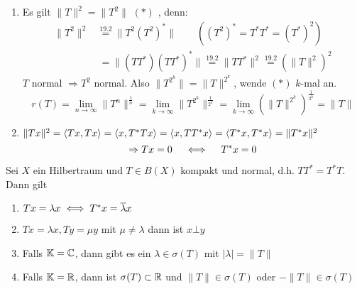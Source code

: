 \begin{beweis}
	\begin{enumerate}[label=\alph*\upshape)]
		\item Es gilt $\| T \|^{2} = \| T^{2} \|$ $(*)$ \label{prop:19.9.5-*}, denn:
			\begin{align*}
				\| T^{2} \|^{2} & \overset{\hyperref[bem:19.2]{19.2}}{=} \| T^{2} \left( T^{2} \right)^{*} \| \qquad \left((T^{2})^{*} = T^{*} T^{*} = (T^{*})^{2}\right) \\
					& ~= \| (T T^{*}) (T T^{*})^{*} \| \overset{\hyperref[bem:19.2]{19.2}}{=} \| T T^{*} \|^{2} \overset{\hyperref[bem:19.2]{19.2}}{=} \left( \| T \|^{2} \right)^{2}
			\end{align*}
			$T$ normal $\Rightarrow T^{2}$ normal. Also $\| T^{2^{k}} \| = \| T \|^{2^{k}}$, wende \hyperref[prop:19.9.5-*]{$(*)$} $k$-mal an. 
			\[ r(T) = \lim_{n \rightarrow \infty} \| T^{n} \|^{\frac{1}{n}} = \lim_{k \rightarrow \infty} \| T^{2^{k}} \|^{\frac{1}{2^{k}}} = \lim_{k \rightarrow \infty} \left( \| T \|^{2^{k}} \right)^{\frac{1}{2^{k}}} = \| T \| \]
		\item $\| T x \|^{2} = \langle T x , T x \rangle = \langle x , T^{*} T x \rangle = \langle x , T T^{*} x \rangle = \langle T	^{*} x , T^{*} x \rangle = \| T^{*} x \|^{2}$ \\
			\[ \Rightarrow T x = 0 \quad \iff \quad T^{*} x = 0 \]
	\end{enumerate}				
\end{beweis}


\begin{lemma} \label{lemma:19.10}
	Sei $X$ ein Hilbertraum und $T \in B(X)$ kompakt und normal, d.h.  $T T^{*} = T^{*} T$. Dann gilt
	\begin{enumerate}[label=\alph*\upshape)]
		\item $T x = \lambda x \iff T^{*} x = \overline{\lambda} x$
		\item $T x = \lambda x, T y = \mu y$ mit $\mu \neq \lambda$  dann ist $x \bot y$
		\item Falls $\mathbb{K} = \mathbb{C}$, dann gibt es ein $\lambda \in \sigma(T)$ mit $| \lambda | = \| T \|$
		\item Falls $\mathbb{K} = \mathbb{R}$, dann ist $\sigma(T) \subset \mathbb{R}$ und $\| T \| \in \sigma(T)$ oder $- \| T \| \in \sigma(T)$
	\end{enumerate}
\end{lemma}

